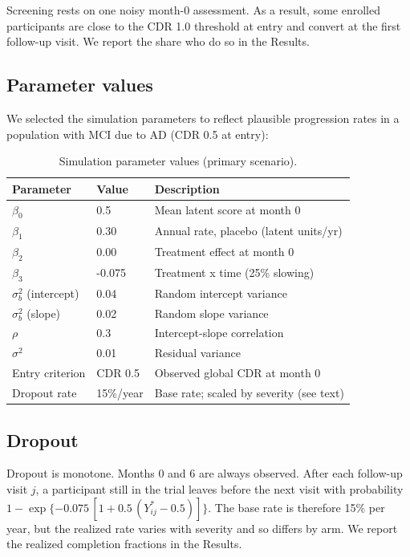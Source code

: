 \documentclass[
  11pt,
]{article}
\begin{document}
Screening rests on one noisy month-0 assessment. As a
result, some enrolled participants are close to the
CDR 1.0 threshold at entry and convert at the first
follow-up visit. We report the share who do so in the
Results.

\subsection{Parameter values}\label{parameter-values}

We selected the simulation parameters to reflect plausible
progression rates in a population with MCI due to AD
(CDR 0.5 at entry):

\begin{table}[!h]
\centering
\caption{\label{tab:sim-params}Simulation parameter values (primary scenario).}
\centering
\fontsize{9}{11}\selectfont
\begin{tabular}[t]{lll}
\toprule
Parameter & Value & Description\\
\midrule
$\beta_0$ & 0.5 & Mean latent score at month 0\\
$\beta_1$ & 0.30 & Annual rate, placebo (latent units/yr)\\
$\beta_2$ & 0.00 & Treatment effect at month 0\\
$\beta_3$ & -0.075 & Treatment x time (25\% slowing)\\
$\sigma_b^2$ (intercept) & 0.04 & Random intercept variance\\
\addlinespace
$\sigma_b^2$ (slope) & 0.02 & Random slope variance\\
$\rho$ & 0.3 & Intercept-slope correlation\\
$\sigma^2$ & 0.01 & Residual variance\\
Entry criterion & CDR 0.5 & Observed global CDR at month 0\\
Dropout rate & 15\%/year & Base rate; scaled by severity (see text)\\
\bottomrule
\end{tabular}
\end{table}

\subsection{Dropout}\label{dropout}

Dropout is monotone. Months 0 and 6 are always observed.
After each follow-up visit \(j\), a participant still in the
trial leaves before the next visit with probability
\(1 - \exp\{-0.075\,[1 + 0.5\,(Y^*_{ij} - 0.5)]\}\). The base
rate is therefore 15\% per year, but the realized rate
varies with severity and so differs by arm. We report the
realized completion fractions in the Results.
\end{document}
